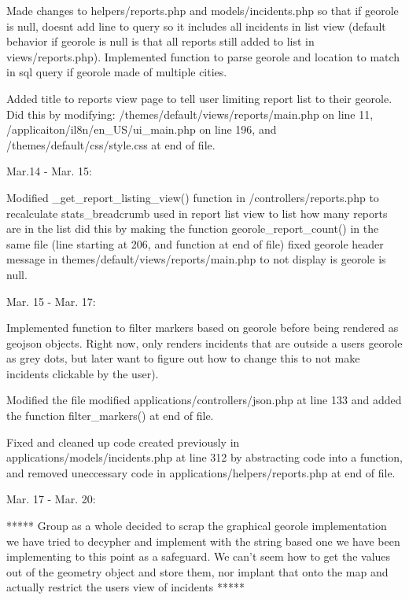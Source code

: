 \documentclass{article}
\begin{document}
    Made changes to helpers/reports.php and models/incidents.php so that if georole is null, doesnt add line to query so it includes all incidents in list view (default behavior if georole is null is that all reports still added to list in views/reports.php). Implemented function to parse georole and location to match in sql query if georole made of multiple cities.
              
    Added title to reports view page to tell user limiting report list to their georole. Did this by modifying: /themes/default/views/reports/main.php on line 11, /applicaiton/il8n/en_US/ui_main.php on line 196, and /themes/default/css/style.css at end of file.
                
Mar.14 - Mar. 15:
                                
    Modified _get_report_listing_view() function in /controllers/reports.php to recalculate stats_breadcrumb used in report list view to list how many reports are in the list did this by making the function georole_report_count() in the same file (line starting at 206, and function at end of file) fixed georole header message in themes/default/views/reports/main.php to not display is georole is null.
                    
Mar. 15 - Mar. 17:
    
    Implemented function to filter markers based on georole before being rendered as geojson objects. Right now, only renders incidents that are outside a users georole as grey dots, but later want to figure out how to change this to not make incidents clickable by the user).
    
    Modified the file modified applications/controllers/json.php at line 133 and added the function filter_markers() at end of file.
    
    Fixed and cleaned up code created previously in applications/models/incidents.php at line 312 by abstracting code into a function, and removed uneccessary code in applications/helpers/reports.php at end of file.
                
Mar. 17 - Mar. 20:

    ***** Group as a whole decided to scrap the graphical georole implementation we have tried to decypher and implement with the string based one we have been implementing to this point as a safeguard.  We can't seem how to get the values out of the geometry object and store them, nor implant that onto the map and actually restrict the users view of incidents *****
\end{document}

